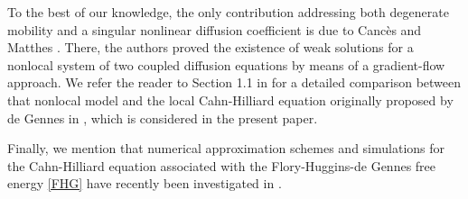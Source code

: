 \documentclass[11pt,  reqno]{amsart}%
\theoremstyle{plain}
\theoremstyle{definition}
\theoremstyle{remark}
\numberwithin{equation}{section}
\begin{document}
To the best of our knowledge, the only contribution addressing both degenerate mobility and a singular nonlinear diffusion coefficient is due to Canc{\`e}s and Matthes \cite{CM2023}. There, the authors proved the existence of weak solutions for a nonlocal system of two coupled diffusion equations by means of a gradient-flow approach. We refer the reader to Section 1.1 in \cite{CM2023} for a detailed comparison between that nonlocal model and the local Cahn-Hilliard equation originally proposed by de Gennes in \cite{GenJCP}, which is considered in the present paper.

Finally, we mention that numerical approximation schemes and simulations for the Cahn-Hilliard equation associated with the Flory-Huggins-de Gennes free energy \eqref{FHG} have recently been investigated in \cite{DWWZ2021,DWWZ2022,ZY2020,YANG2016}.
\end{document}
